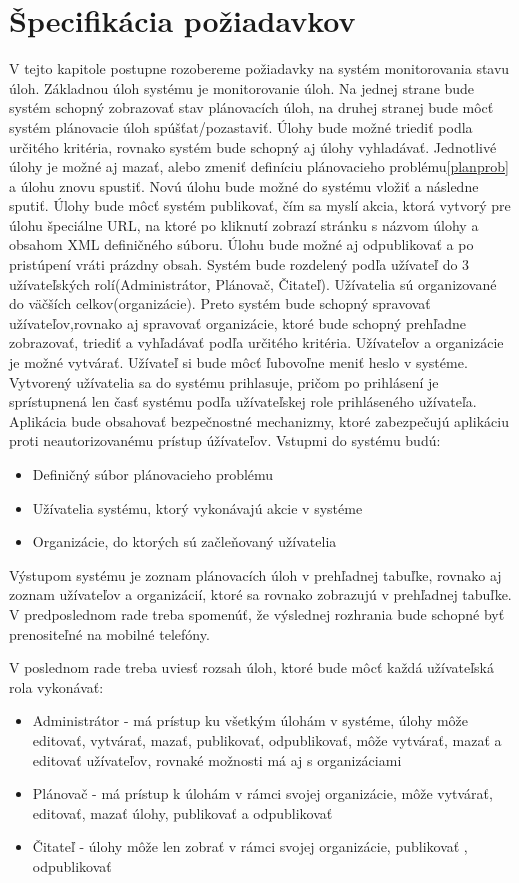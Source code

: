 \section{Špecifikácia požiadavkov}
V tejto kapitole postupne rozobereme požiadavky na systém monitorovania stavu úloh. Základnou úloh systému je monitorovanie úloh. Na jednej strane bude systém schopný zobrazovať stav plánovacích úloh, na druhej stranej bude môcť systém plánovacie úloh spúšťat/pozastaviť. Úlohy bude možné triediť podla určitého kritéria, rovnako systém bude schopný aj úlohy vyhladávať. Jednotlivé úlohy je možné aj mazať, alebo zmeniť definíciu plánovacieho problému\ref{planprob} a úlohu znovu spustiť. Novú úlohu bude možné do systému vložiť a následne sputiť. Úlohy bude môcť systém publikovať, čím sa myslí akcia, ktorá vytvorý pre úlohu špeciálne URL, na ktoré po kliknutí zobrazí stránku s názvom úlohy a obsahom XML definičného súboru. Úlohu bude možné aj odpublikovať a po pristúpení vráti prázdny obsah.
 Systém bude rozdelený podľa užívateľ do 3 užívateľských rolí(Administrátor, Plánovač, Čitateľ). Užívatelia sú organizované do väčších celkov(organizácie). Preto systém bude schopný spravovať užívateľov,rovnako aj spravovať organizácie, ktoré bude schopný prehľadne zobrazovať, triediť a vyhľadávať podľa určitého kritéria. Užívateľov a organizácie je možné vytvárať. Užívateľ si bude môcť ľubovoľne meniť heslo v systéme. Vytvorený užívatelia sa do systému prihlasuje, pričom po prihlásení je sprístupnená len časť systému podľa užívateľskej role prihláseného užívateľa. Aplikácia bude obsahovať bezpečnostné mechanizmy, ktoré zabezpečujú aplikáciu proti neautorizovanému prístup úžívateľov. Vstupmi do systému budú:\begin{itemize}
\item Definičný súbor plánovacieho problému
\item Užívatelia systému, ktorý vykonávajú akcie v systéme
\item Organizácie, do ktorých sú začleňovaný užívatelia
\end{itemize}
Výstupom systému je zoznam plánovacích úloh v prehľadnej tabuľke, rovnako aj zoznam užívateľov a organizácií, ktoré sa rovnako zobrazujú v prehľadnej tabuľke. V predposlednom rade treba spomenúť, že výslednej rozhrania bude schopné byť prenositeľné na mobilné telefóny. 

V poslednom rade treba uviesť rozsah úloh, ktoré bude môcť každá užívateľská rola vykonávať:
\begin{itemize}
\item Administrátor - má prístup ku všetkým úlohám v systéme, úlohy môže editovať, vytvárať, mazať, publikovať, odpublikovať, môže vytvárať, mazať a editovať užívateľov, rovnaké možnosti má aj s organizáciami
\item Plánovač - má prístup k úlohám v rámci svojej organizácie, môže vytvárať, editovať, mazať úlohy, publikovať a odpublikovať
\item Čitateľ - úlohy môže len zobrať v rámci svojej organizácie, publikovať , odpublikovať
\end{itemize}

